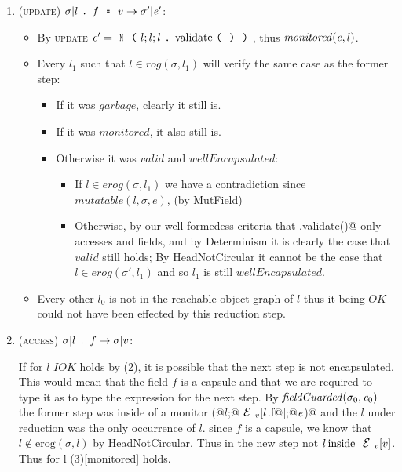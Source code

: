 \begin{enumerate}
\item (\textsc{update}) $\sigma|l\singleDot f\equals v\rightarrow \sigma'|\e'$:
\begin{itemize}
  \item By \textsc{update} $\e'=\Kw{M}\oR l;l;l\singleDot\text{validate}\oR\cR\cR$, thus $\mathit{monitored}({\mathit{e}},l)$.
  \item Every $l_1$ such that $l\in \mathit{rog}(\sigma,l_1)$ will verify the same case
  as the former step:
  \begin{itemize}
  	\item If it was $\mathit{garbage}$, clearly it still is.
  	\item If it was $\mathit{monitored}$, it also still is.
    \item Otherwise it was $\mathit{valid}$ and $\mathit{wellEncapsulated}$:
		\begin{itemize}
			\item If $l\in \mathit{erog}(\sigma,l_1)$ we have a contradiction since $mutatable(l, \sigma, e)$, (by MutField)
	    \item Otherwise, by our well-formedess criteria that \Q@.validate()@ only accesses \Q@imm@ and \Q@capsule@ fields, and by Determinism it is clearly the case that $\mathit{valid}$ still holds;
By HeadNotCircular it cannot be the case that $l\in \mathit{erog}(\sigma',l_1)$ and so $l_1$ is still $\mathit{wellEncapsulated}$.
	  \end{itemize}
  \end{itemize}
  \item Every other $l_0$ is not in the reachable object graph of $l$
  thus it being $\mathit{OK}$ could not have been effected by this reduction step.
\end{itemize}

\item (\textsc{access}) $\sigma|l\singleDot f \rightarrow \sigma|v$:

    If for $l$ $IOK$ holds by (2),  
    it is possible that the next step is not encapsulated.
    This would mean that the field $f$ is a capsule and that we are required
to type it as \Q@mut@ to type the expression for the next step.
By $\mathit{fieldGuarded}(\sigma_0,\e_0)$
    the former step was inside of a monitor \Q@M(@$l$\Q@;@$\ctx_v[l$\Q@.f@$]$\Q@;@${\mathit{e}}$\Q@)@
    and the $l$ under reduction was the only occurrence of $l$.
    since $f$ is a capsule, we know that $l\notin \text{erog}(\sigma,l)$
    by HeadNotCircular.
    Thus in the new step not $l\, \text{inside}\ \ctx_v[v]$.
    Thus for l (3)[monitored] holds.
    

\end{enumerate}
